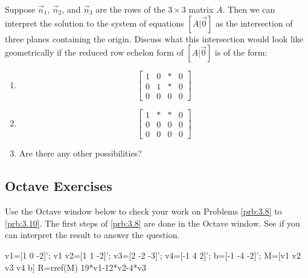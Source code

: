 \documentclass{ximera}
\begin{document}
\begin{problem}\label{prob:Anna3.2}
        Suppose $\vec{n}_1$, $\vec{n}_2$, and $\vec{n}_3$ are the rows of the $3 \times 3$ matrix $A$.  Then we can interpret the solution to the system of equations $[A|\vec{0}]$ as the intersection of three planes containing the origin.  Discuss what this intersection would look like geometrically if the reduced row echelon form of $[A|\vec{0}]$ is of the form:

\begin{enumerate}
\item
\begin{equation*}
\left[
\begin{array}{ccc|c}
1 & 0 & * & 0 \\
0 & 1 & * & 0 \\
0 & 0 & 0 & 0
\end{array}
\right]
\end{equation*}

\item
\begin{equation*}
\left[
\begin{array}{ccc|c}
1 & * & * & 0 \\
0 & 0 & 0 & 0 \\
0 & 0 & 0 & 0
\end{array}
\right]
\end{equation*}

\item  Are there any other possibilities?
            
\end{enumerate}
\end{problem}

\subsection*{Octave Exercises}
\begin{problem}\label{oct:lincomb}
Use the Octave window below to check your work on Problems \ref{prb:3.8} to \ref{prb:3.10}.  The first steps of \ref{prb:3.8} are done in the Octave window.  See if you can interpret the result to answer the question.

v1=[1 0 -2]';
v1
v2=[1 1 -2]';
v3=[2 -2 -3]';
v4=[-1 4 2]';
b=[-1 -4 -2]';
M=[v1 v2 v3 v4 b]
R=rref(M)
19*v1-12*v2-4*v3
\end{problem}
\end{document}
